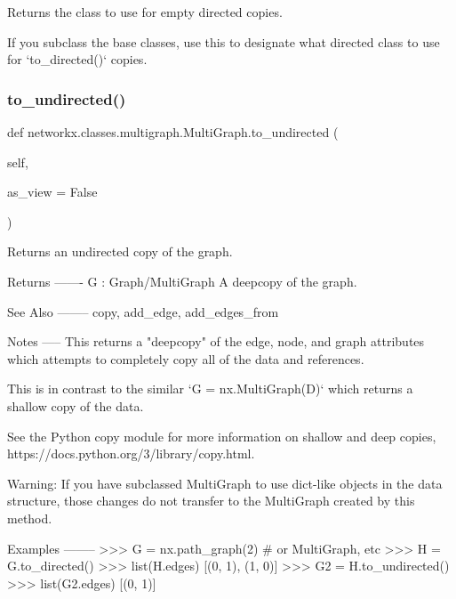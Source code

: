\begin{DoxyVerb}Returns the class to use for empty directed copies.

If you subclass the base classes, use this to designate
what directed class to use for `to_directed()` copies.
\end{DoxyVerb}
 \mbox{\label{classnetworkx_1_1classes_1_1multigraph_1_1MultiGraph_a83bc2a7096c66f75d86d9132934f8337}} 
\subsubsection{\texorpdfstring{to\+\_\+undirected()}{to\_undirected()}}
{\footnotesize\ttfamily def networkx.\+classes.\+multigraph.\+Multi\+Graph.\+to\+\_\+undirected (\begin{DoxyParamCaption}\item[{}]{self,  }\item[{}]{as\+\_\+view = {\ttfamily False} }\end{DoxyParamCaption})}

\begin{DoxyVerb}Returns an undirected copy of the graph.

Returns
-------
G : Graph/MultiGraph
    A deepcopy of the graph.

See Also
--------
copy, add_edge, add_edges_from

Notes
-----
This returns a "deepcopy" of the edge, node, and
graph attributes which attempts to completely copy
all of the data and references.

This is in contrast to the similar `G = nx.MultiGraph(D)`
which returns a shallow copy of the data.

See the Python copy module for more information on shallow
and deep copies, https://docs.python.org/3/library/copy.html.

Warning: If you have subclassed MultiGraph to use dict-like
objects in the data structure, those changes do not transfer
to the MultiGraph created by this method.

Examples
--------
>>> G = nx.path_graph(2)  # or MultiGraph, etc
>>> H = G.to_directed()
>>> list(H.edges)
[(0, 1), (1, 0)]
>>> G2 = H.to_undirected()
>>> list(G2.edges)
[(0, 1)]
\end{DoxyVerb}
 \mbox{\label{classnetworkx_1_1classes_1_1multigraph_1_1MultiGraph_acf6039f4ab4a2fbca08d0c76d92c6357}} 
